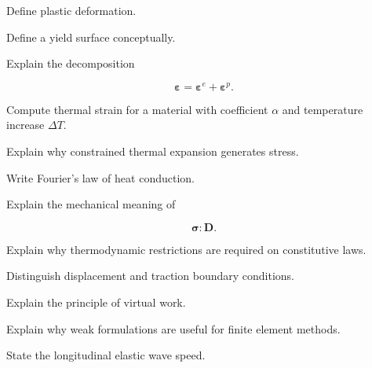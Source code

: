 \begin{exercise}[2]
Define plastic deformation.
\end{exercise}

\begin{exercise}[2]
Define a yield surface conceptually.
\end{exercise}

\begin{exercise}[3]
Explain the decomposition

\[
\boldsymbol{\varepsilon}
=
\boldsymbol{\varepsilon}^{e}
+
\boldsymbol{\varepsilon}^{p}.
\]
\end{exercise}

\begin{exercise}[2]
Compute thermal strain for a material with coefficient \(\alpha\) and
temperature increase \(\Delta T\).
\end{exercise}

\begin{exercise}[3]
Explain why constrained thermal expansion generates stress.
\end{exercise}

\begin{exercise}[2]
Write Fourier's law of heat conduction.
\end{exercise}

\begin{exercise}[3]
Explain the mechanical meaning of

\[
\boldsymbol{\sigma}:\mathbf{D}.
\]
\end{exercise}

\begin{exercise}[3]
Explain why thermodynamic restrictions are required on constitutive laws.
\end{exercise}

\begin{exercise}[2]
Distinguish displacement and traction boundary conditions.
\end{exercise}

\begin{exercise}[3]
Explain the principle of virtual work.
\end{exercise}

\begin{exercise}[3]
Explain why weak formulations are useful for finite element methods.
\end{exercise}

\begin{exercise}[2]
State the longitudinal elastic wave speed.
\end{exercise}


